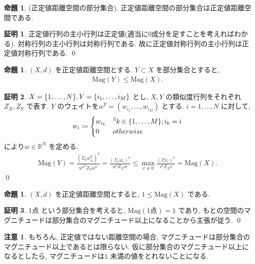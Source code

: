 \documentclass[10pt, fleqn, label-section=none]{bxjsarticle}
\theoremstyle{definition}
\newtheorem{prop}[dfn]{命題}
\newtheorem*{pf*}{証明}
\newtheorem{remark}[dfn]{注意}
\newcommand{\cbra}[1]{\mleft\{#1\mright\}}
\renewcommand{\;}{\, ; \,}
\newcommand{\Mag}{\textrm{Mag}}
\begin{document}
\begin{prop}(正定値距離空間の部分集合). 正定値距離空間の部分集合は正定値距離空間である. 

\end{prop}
\begin{pf*}
正定値行列の主小行列は正定値(適当に$0$成分を足すことを考えればわかる). 対称行列の主小行列は対称行列である. 故に正定値対称行列の主小行列は正定値対称行列である.  
\qed
\end{pf*}

\begin{prop}$(X, d)$ を正定値距離空間とする. $Y \subset X$ を部分集合とすると, 
\begin{align*} \Mag(Y) \leq \Mag(X). \end{align*}
\end{prop}
\begin{pf*}
$X = \cbra{1, \ldots , N}, Y = \cbra{i_1, \ldots , i_M}$ とし, $X, Y$ の類似度行列をそれぞれ$Z_X, Z_Y$ で表す. $Y$ のウェイトを$w^Y = (w_{i_1}, \ldots , w_{i_M})$ とする. $i = 1,\ldots , N$ に対して, 
\begin{align*} w_i \coloneqq \begin{cases} w_{i_k} & ^\exists k \in \cbra{1, \ldots , M} ; i_k = i \\ 0 & otherwise  \end{cases} \end{align*}
により$w \in \mathbb R^N$ を定める. 
\begin{align*} \Mag(Y) =  \frac{ (\Sigma_k w^Y_{i_k} )^2 }{{w^Y}^t Z_Y w^Y} = \frac{ (\Sigma_i w_i )^2 }{{w}^t Z_X w} \leq \max_{v \neq 0} \frac{ (\Sigma v_i )^2 }{v^t Z_X v} = \Mag(X).  \end{align*}
\qed
\end{pf*}

\begin{prop}$(X, d)$ を正定値距離空間とすると, $1 \leq \Mag(X)$ である.  
\end{prop}
\begin{pf*}
$1$点 という部分集合を考えると, $\Mag(\textrm{1点}) = 1$ であり, もとの空間のマグニチュードは部分集合のマグニチュード以上になることから主張が従う. 
\qed
\end{pf*}

\begin{remark}もちろん, 正定値ではない距離空間の場合, マグニチュードは部分集合のマグニチュード以上であるとは限らない. 仮に部分集合のマグニチュード以上になるとしたら, マグニチュードは$1$ 未満の値をとれないことになる. 
\end{remark}
\end{document}
